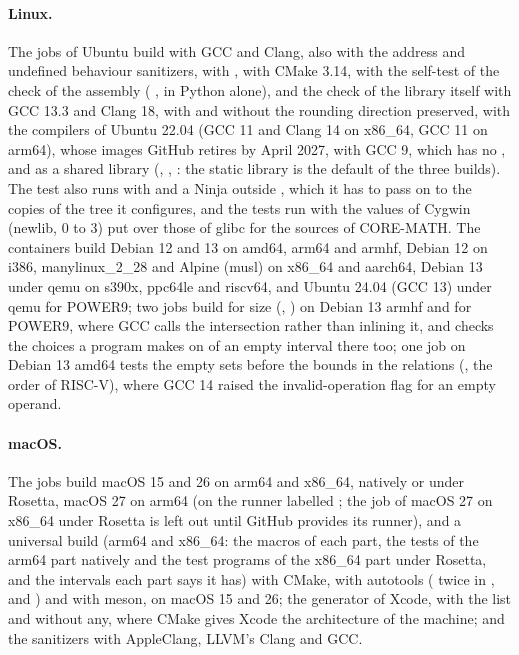 \documentclass[12pt,a4paper,twoside,openright]{book}
\begin{document}
\paragraph{Linux.} The jobs of Ubuntu build with GCC and Clang, also with
the address and undefined behaviour sanitizers, with
, with CMake 3.14, with the self-test of the
check of the assembly (
, in Python alone), and the check of the library itself
with GCC 13.3 and Clang 18, with and without the rounding direction
preserved,\newinvfive{} with the compilers of Ubuntu
22.04 (GCC 11 and Clang 14 on x86\_64, GCC 11 on arm64), whose images GitHub
retires by April 2027, with GCC 9, which has no
, and as a shared library
(, ,
: the static library is the default of the
three builds).\newinvfive{} The test  also
runs with  and a Ninja outside , which it has
to pass on to the copies of the tree it configures, and the tests run with
the  values of Cygwin (newlib, 0 to 3) put over those of glibc
for the sources of CORE-MATH. The containers build Debian 12 and 13 on
amd64, arm64 and armhf, Debian 12 on i386, manylinux\_2\_28 and Alpine
(musl) on x86\_64 and aarch64, Debian 13 under qemu on s390x, ppc64le and
riscv64, and Ubuntu 24.04 (GCC 13) under qemu for POWER9; two jobs build for
size (, ) on Debian 13 armhf and for POWER9,
where GCC calls the intersection rather than inlining it, and
 checks the choices a program makes on
 of an empty interval there too; one job on Debian 13
amd64 tests the empty sets before the bounds in the relations
(, the order of RISC-V), where GCC
14 raised the invalid-operation flag for an empty operand.

\paragraph{macOS.} The jobs build macOS 15 and 26 on arm64 and x86\_64,
natively or under Rosetta, macOS 27 on arm64 (on the runner labelled
; the job of macOS 27 on x86\_64 under Rosetta is left out until
GitHub provides its runner), and a universal build (arm64 and x86\_64: the
macros of each part, the tests of the arm64 part natively and the test
programs of the x86\_64 part under Rosetta, and the intervals each part says
it has)\newinvfive{} with CMake, with autotools ( twice in
,  and ) and with meson, on macOS 15
and 26; the generator of Xcode, with the list  and
without any, where CMake gives Xcode the architecture of the machine; and
the sanitizers with AppleClang, LLVM's Clang and GCC.
\end{document}
